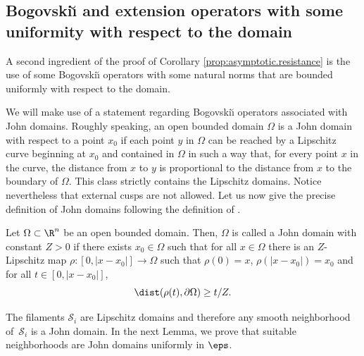 \subsection{Bogovski\u{\i} and extension operators with some uniformity with respect to the domain} \label{sec:H^1.estimates}

A second ingredient of the proof of Corollary \ref{prop:asymptotic.resistance} is the use of some
Bogovski\u{\i} operators with some natural norms that are bounded uniformly with respect to the domain.

We will make use of a statement regarding Bogovski\u{\i} operators associated with John domains. Roughly speaking, an open bounded domain $\Omega$ is
a John domain with respect to a point $x_0$ if each point $y$ in $\Omega$ can be reached by a Lipschitz curve beginning at $x_0$ and contained in
$\Omega$ in such a way that, for every point $x$ in the curve, the distance from $x$ to $y$ is proportional to the distance from $x$ to the boundary of $\Omega$.
This class strictly contains the Lipschitz domains. Notice nevertheless that
external cusps are not allowed.
Let us {now} give the precise
definition of John domains following the definition of \cite{AcostaDuranMuschietti06}.

\begin{Definition}
Let $\Omega \subset \R^n$ be an open bounded domain. Then, $\Omega$ is called a John domain with constant $Z > 0$ if there exists $x_0 \in \Omega$
such that for all $x \in \Omega$ there is an $Z$-Lipschitz map $\rho \colon [0,|x-x_0|] \to \Omega$ such that $\rho(0) = x$, $\rho(|x-x_0|) = x_0$ and for all $t \in [0,|x-x_0|]$,
\begin{equation}
\label{dist-bd}
\dist(\rho(t),\partial \Omega) \geq t/Z.
\end{equation}
\end{Definition}

The filaments $\mathcal S_i$ are Lipschitz domains and therefore any smooth neighborhood of~$\mathcal S_i$ is a John domain. In the next Lemma, we prove that suitable neighborhoods are John domains uniformly in $\eps$.

